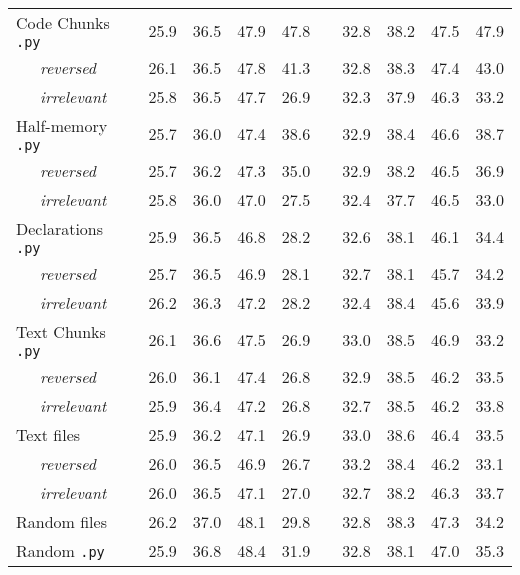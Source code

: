 \begin{table}
{\begin{tabular}{lc cc>{\columncolor{gray!30}}cc c cc>{\columncolor{gray!30}}cc}
    \cmidrule(lr){1-1}
    Code Chunks \texttt{.py} & & 25.9 & 36.5 & 47.9 & 47.8 & & 32.8 & 38.2 & 47.5 & 47.9 \\
    ~~~\textit{reversed} & & 26.1 & 36.5 & 47.8 & 41.3 & & 32.8 & 38.3 & 47.4 & 43.0 \\
    ~~~\textit{irrelevant} & & 25.8 & 36.5 & 47.7 & 26.9 & & 32.3 & 37.9 & 46.3 & 33.2 \\
    
    \cmidrule(lr){1-1}
    Half-memory \texttt{.py} & & 25.7 & 36.0 & 47.4 & 38.6 & & 32.9 & 38.4 & 46.6 & 38.7 \\
    ~~~\textit{reversed} & & 25.7 & 36.2 & 47.3 & 35.0 & & 32.9 & 38.2 & 46.5 & 36.9 \\
    ~~~\textit{irrelevant} & & 25.8 & 36.0 & 47.0 & 27.5 & & 32.4 & 37.7 & 46.5 & 33.0 \\
    
    \cmidrule(lr){1-1}
    Declarations \texttt{.py} & & 25.9 & 36.5 & 46.8 & 28.2 & & 32.6 & 38.1 & 46.1 & 34.4 \\
    ~~~\textit{reversed} & & 25.7 & 36.5 & 46.9 & 28.1 & & 32.7 & 38.1 & 45.7 & 34.2 \\
    ~~~\textit{irrelevant} & & 26.2 & 36.3 & 47.2 & 28.2 & & 32.4 & 38.4 & 45.6 & 33.9 \\
    
    \cmidrule(lr){1-1}
    Text Chunks \texttt{.py} & & 26.1 & 36.6 & 47.5 & 26.9 & & 33.0 & 38.5 & 46.9 & 33.2 \\
    ~~~\textit{reversed} & & 26.0 & 36.1 & 47.4 & 26.8 & & 32.9 & 38.5 & 46.2 & 33.5 \\
    ~~~\textit{irrelevant} & & 25.9 & 36.4 & 47.2 & 26.8 & & 32.7 & 38.5 & 46.2 & 33.8 \\
    
    \cmidrule(lr){1-1}
    Text files & & 25.9 & 36.2 & 47.1 & 26.9 & & 33.0 & 38.6 & 46.4 & 33.5 \\
    ~~~\textit{reversed} & & 26.0 & 36.5 & 46.9 & 26.7 & & 33.2 & 38.4 & 46.2 & 33.1 \\
    ~~~\textit{irrelevant} & & 26.0 & 36.5 & 47.1 & 27.0 & & 32.7 & 38.2 & 46.3 & 33.7 \\
    
    \cmidrule(lr){1-1}
    Random files & & 26.2 & 37.0 & 48.1 & 29.8 & & 32.8 & 38.3 & 47.3 & 34.2 \\
    
    \cmidrule(lr){1-1}
    Random \texttt{.py} & & 25.9 & 36.8 & 48.4 & 31.9 & & 32.8 & 38.1 & 47.0 & 35.3 \\


\end{tabular}}
\end{table}
